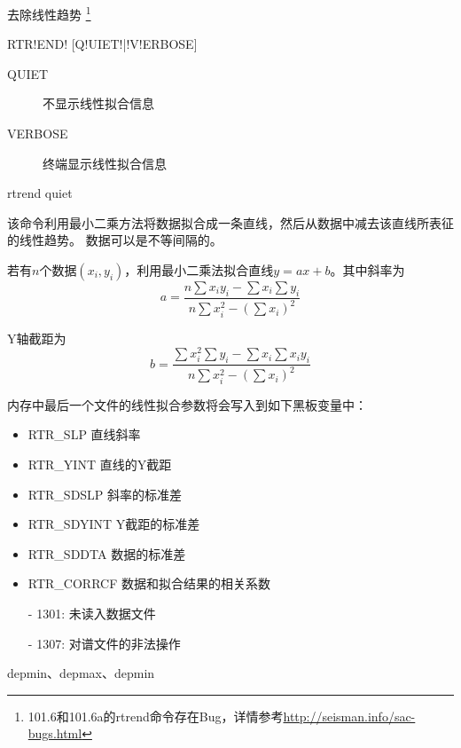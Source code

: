 \label{cmd:rtrend}

去除线性趋势
\footnote{101.6和101.6a的rtrend命令存在Bug，详情参考\url{http://seisman.info/sac-bugs.html}}

\begin{SACSTX}
RTR!END! [Q!UIET!|!V!ERBOSE]
\end{SACSTX}

\begin{description}
\item [QUIET] 不显示线性拟合信息
\item [VERBOSE] 终端显示线性拟合信息
\end{description}

\begin{SACDFT}
rtrend quiet
\end{SACDFT}

该命令利用最小二乘方法将数据拟合成一条直线，然后从数据中减去该直线所表征的线性趋势。
数据可以是不等间隔的。

若有$n$个数据$(x_i,y_i)$，利用最小二乘法拟合直线$y=ax+b$。其中斜率为
\[
    a = \frac{n\sum x_i y_i - \sum x_i \sum y_i}
    {n\sum x_i^2 - (\sum x_i)^2}
\]

Y轴截距为
\[
    b = \frac{\sum x_i^2 \sum y_i - \sum x_i \sum x_i y_i}
    {n\sum x_i^2 - (\sum x_i)^2}
\]

内存中最后一个文件的线性拟合参数将会写入到如下黑板变量中：
\begin{itemize}
\item RTR\_SLP 直线斜率
\item RTR\_YINT 直线的Y截距
\item RTR\_SDSLP 斜率的标准差
\item RTR\_SDYINT Y截距的标准差
\item RTR\_SDDTA 数据的标准差
\item RTR\_CORRCF 数据和拟合结果的相关系数
\end{itemize}

\begin{itemize}
\item[-]1301: 未读入数据文件
\item[-]1307: 对谱文件的非法操作
\end{itemize}

depmin、depmax、depmin
